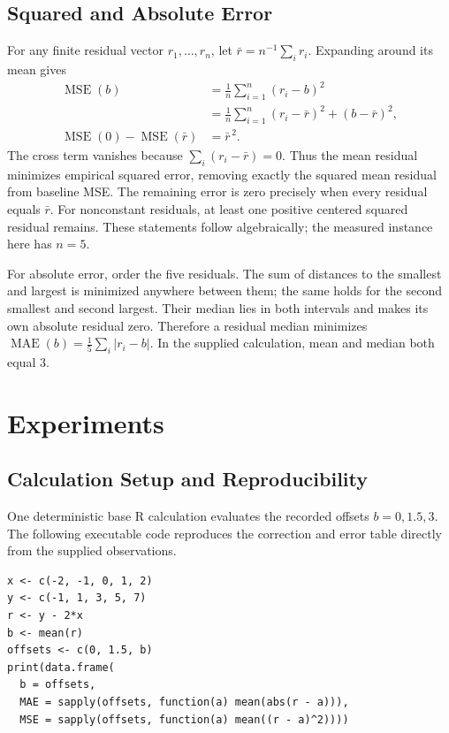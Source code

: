\documentclass[11pt]{article}
\begin{document}
\subsection{Squared and Absolute Error}

For any finite residual vector \(r_1,\ldots,r_n\), let
\(\bar r=n^{-1}\sum_i r_i\). Expanding around its mean gives
\begin{align*}
\operatorname{MSE}(b)
&=\frac{1}{n}\sum_{i=1}^{n}(r_i-b)^2\\
&=\frac{1}{n}\sum_{i=1}^{n}(r_i-\bar r)^2
  +(b-\bar r)^2,\\
\operatorname{MSE}(0)-\operatorname{MSE}(\bar r)
&=\bar r^{\,2}.
\end{align*}
The cross term vanishes because \(\sum_i(r_i-\bar r)=0\).
Thus the mean residual minimizes empirical squared error, removing
exactly the squared mean residual from baseline MSE. The remaining
error is zero precisely when every residual equals \(\bar r\).
For nonconstant residuals, at least one positive centered squared
residual remains. These statements follow algebraically; the measured
instance here has \(n=5\).

For absolute error, order the five residuals. The sum of distances to
the smallest and largest is minimized anywhere between them; the same
holds for the second smallest and second largest. Their median lies
in both intervals and makes its own absolute residual zero. Therefore
a residual median minimizes
\(\operatorname{MAE}(b)=\frac{1}{5}\sum_i|r_i-b|\).
In the supplied calculation, mean and median both equal \(3\).

\section{Experiments}

\subsection{Calculation Setup and Reproducibility}

One deterministic base R calculation evaluates the recorded offsets
\(b=0,1.5,3\). The following executable code reproduces the correction
and error table directly from the supplied observations.

\begingroup
\small
\begin{verbatim}
x <- c(-2, -1, 0, 1, 2)
y <- c(-1, 1, 3, 5, 7)
r <- y - 2*x
b <- mean(r)
offsets <- c(0, 1.5, b)
print(data.frame(
  b = offsets,
  MAE = sapply(offsets, function(a) mean(abs(r - a))),
  MSE = sapply(offsets, function(a) mean((r - a)^2))))
\end{verbatim}
\endgroup
\end{document}
